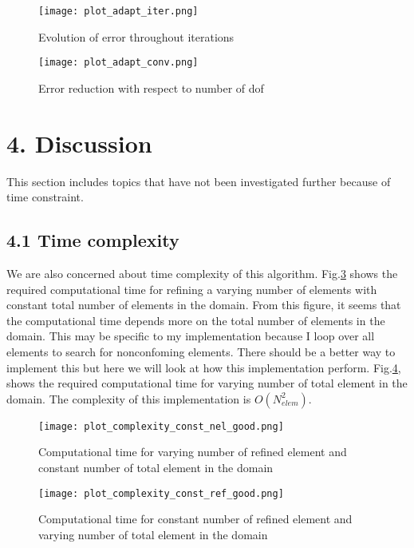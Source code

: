\documentclass[11pt, letterpaper, hidelinks]{article}
\theoremstyle{definition}
\begin{document}
\begin{figure}[H]
    \texttt{[image: plot\_adapt\_iter.png]}
    \centering
    \caption{Evolution of error throughout iterations}
    \label{fig:adapt_iter}
\end{figure}

\begin{figure}[H]
    \texttt{[image: plot\_adapt\_conv.png]}
    \centering
    \caption{Error reduction with respect to number of dof}
    \label{fig:adapt_conv}
\end{figure}

\section{4. Discussion}

This section includes topics that have not been investigated further because of time constraint.

\subsection{4.1 Time complexity}

We are also concerned about time complexity of this algorithm. Fig.\ref{fig:complexity_const_nel_good} shows the required computational time for refining a varying number of elements with constant total number of elements in the domain. From this figure, it seems that the computational time depends more on the total number of elements in the domain. This may be specific to my implementation because I loop over all elements to search for nonconfoming elements. There should be a better way to implement this but here we will look at how this implementation perform. Fig.\ref{fig:complexity_const_ref_good}, shows the required computational time for varying number of total element in the domain. The complexity of this implementation is $O(N_{elem}^2)$.

\begin{figure}[H]
    \texttt{[image: plot\_complexity\_const\_nel\_good.png]}
    \centering
    \caption{Computational time for varying number of refined element and constant number of total element in the domain}
    \label{fig:complexity_const_nel_good}
\end{figure}

\begin{figure}[H]
    \texttt{[image: plot\_complexity\_const\_ref\_good.png]}
    \centering
    \caption{Computational time for constant number of refined element and varying number of total element in the domain}
    \label{fig:complexity_const_ref_good}
\end{figure}
\end{document}
